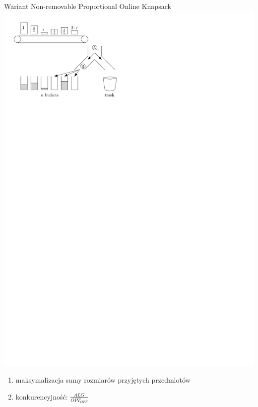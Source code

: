 \documentclass{beamer}
\begin{document}
\begin{frame}{Wariant Non-removable Proportional Online Knapsack}
  \includegraphics{figs/problem_formulation.pdf}
  \begin{enumerate}
    \item maksymalizacja sumy rozmiarów przyjętych przedmiotów
    \item konkurencyjność: $\frac{ALG}{OPT_{OFF}}$
  \end{enumerate}
\end{frame}
\end{document}
